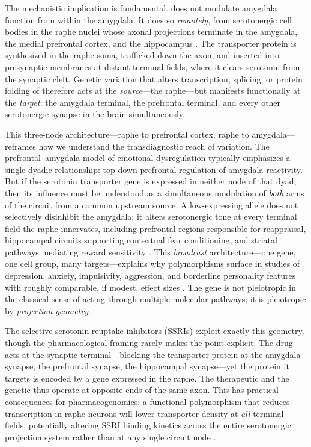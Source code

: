 The mechanistic implication is fundamental.  does not modulate
amygdala function from within the amygdala. It does so \emph{remotely}, from
serotonergic cell bodies in the raphe nuclei whose axonal projections terminate
in the amygdala, the medial prefrontal cortex, and the hippocampus
\cite{hale2012functional}. The transporter protein is synthesized in the raphe
soma, trafficked down the axon, and inserted into presynaptic membranes at
distant terminal fields, where it clears serotonin from the synaptic cleft.
Genetic variation that alters transcription, splicing, or protein folding of
 therefore acts at the \emph{source}---the raphe---but manifests
functionally at the \emph{target}: the amygdala terminal, the prefrontal
terminal, and every other serotonergic synapse in the brain simultaneously.

This three-node architecture---raphe to prefrontal cortex, raphe to
amygdala---reframes how we understand the transdiagnostic reach of
 variation. The prefrontal--amygdala model of emotional
dysregulation typically emphasizes a single dyadic relationship: top-down
prefrontal regulation of amygdala reactivity. But if the serotonin transporter
gene is expressed in neither node of that dyad, then its influence must be
understood as a simultaneous modulation of \emph{both} arms of the circuit from
a common upstream source. A low-expressing  allele does not
selectively disinhibit the amygdala; it alters serotonergic tone at every
terminal field the raphe innervates, including prefrontal regions responsible
for reappraisal, hippocampal circuits supporting contextual fear conditioning,
and striatal pathways mediating reward sensitivity
\cite{murphy2008serotonin, canli2006long}. This \emph{broadcast}
architecture---one gene, one cell group, many targets---explains why
 polymorphisms surface in studies of depression, anxiety,
impulsivity, aggression, and borderline personality features with roughly
comparable, if modest, effect sizes \cite{karg2011serotonin}. The gene is not
pleiotropic in the classical sense of acting through multiple molecular
pathways; it is pleiotropic by \emph{projection geometry}.

The selective serotonin reuptake inhibitors (SSRIs) exploit exactly this
geometry, though the pharmacological framing rarely makes the point explicit.
The drug acts at the synaptic terminal---blocking the transporter protein at
the amygdala synapse, the prefrontal synapse, the hippocampal synapse---yet the
protein it targets is encoded by a gene expressed in the raphe. The therapeutic
and the genetic thus operate at opposite ends of the same axon. This has
practical consequences for pharmacogenomics: a functional polymorphism that
reduces  transcription in raphe neurons will lower transporter
density at \emph{all} terminal fields, potentially altering SSRI binding
kinetics across the entire serotonergic projection system rather than at any
single circuit node \cite{murphy2004pharmacogenomics}.

